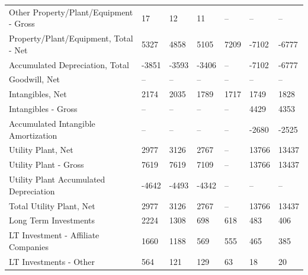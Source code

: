 \documentclass[grad,numbers]{coppe}
\begin{document}
\begin{longtable}[t]{lllllll}
  \hspace{1em}\hspace{1em}Other Property/Plant/Equipment - Gross & 17 & 12 & 11 & -- & -- & --\\
  \hspace{1em}Property/Plant/Equipment, Total - Net & 5327 & 4858 & 5105 & 7209 & -7102 & -6777\\
  \hspace{1em}\hspace{1em}Accumulated Depreciation, Total & -3851 & -3593 & -3406 & -- & -7102 & -6777\\
  \hspace{1em}Goodwill, Net & -- & -- & -- & -- & -- & --\\
  \hspace{1em}Intangibles, Net & 2174 & 2035 & 1789 & 1717 & 1749 & 1828\\
  \hspace{1em}\hspace{1em}Intangibles - Gross & -- & -- & -- & -- & 4429 & 4353\\
  \hspace{1em}\hspace{1em}Accumulated Intangible Amortization & -- & -- & -- & -- & -2680 & -2525\\
  \hspace{1em}Utility Plant, Net & 2977 & 3126 & 2767 & -- & 13766 & 13437\\
  \hspace{1em}\hspace{1em}Utility Plant - Gross & 7619 & 7619 & 7109 & -- & 13766 & 13437\\
  \hspace{1em}\hspace{1em}Utility Plant Accumulated Depreciation & -4642 & -4493 & -4342 & -- & -- & --\\
  \hspace{1em}Total Utility Plant, Net & 2977 & 3126 & 2767 & -- & 13766 & 13437\\
  \hspace{1em}Long Term Investments & 2224 & 1308 & 698 & 618 & 483 & 406\\
  \hspace{1em}\hspace{1em}LT Investment - Affiliate Companies & 1660 & 1188 & 569 & 555 & 465 & 385\\
  \hspace{1em}\hspace{1em}LT Investments - Other & 564 & 121 & 129 & 63 & 18 & 20\\

\end{longtable}
\end{document}
